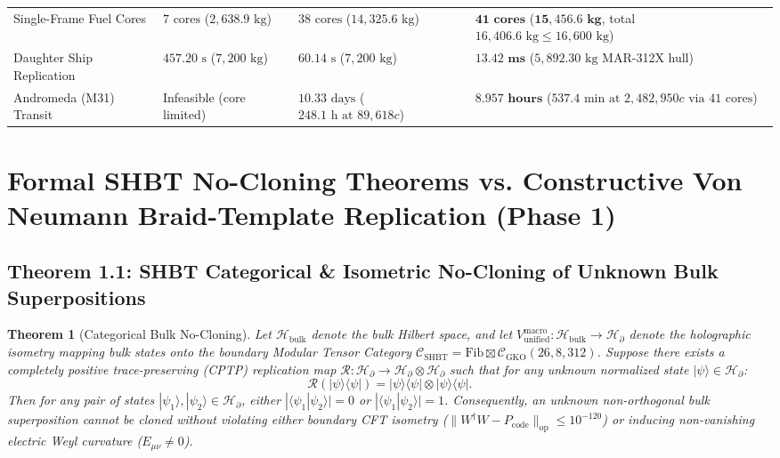 \documentclass[11pt,onecolumn]{article}
\newtheorem{theorem}{Theorem}
\begin{document}
\begin{table}[!htbp]
{\begin{tabular}{@{}llll@{}}
Single-Frame Fuel Cores & $7\text{ cores}$ ($2{,}638.9\text{ kg}$) & $38\text{ cores}$ ($14{,}325.6\text{ kg}$) & $\mathbf{41\text{ cores}}$ ($\mathbf{15{,}456.6\text{ kg}}$, total $16{,}406.6\text{ kg} \le 16{,}600\text{ kg}$) \\
Daughter Ship Replication & $457.20\text{ s}$ ($7{,}200\text{ kg}$) & $60.14\text{ s}$ ($7{,}200\text{ kg}$) & $\mathbf{13.42\text{ ms}}$ ($5{,}892.30\text{ kg}$ MAR-312X hull) \\
Andromeda (M31) Transit & Infeasible (core limited) & $10.33\text{ days}$ ($248.1\text{ h at } 89{,}618c$) & $\mathbf{8.957\text{ hours}}$ ($537.4\text{ min at } 2{,}482{,}950c\text{ via } 41\text{ cores}$) \\
\bottomrule
\end{tabular}%
}
\end{table}
\FloatBarrier
\section{Formal SHBT No-Cloning Theorems vs. Constructive Von Neumann Braid-Template Replication (Phase 1)}

\subsection{Theorem 1.1: SHBT Categorical \& Isometric No-Cloning of Unknown Bulk Superpositions}
\begin{theorem}[Categorical Bulk No-Cloning]
\label{thm:cat_no_clone}
Let $\mathcal{H}_{\text{bulk}}$ denote the bulk Hilbert space, and let $V_{\text{unified}}^{\text{macro}} : \mathcal{H}_{\text{bulk}} \to \mathcal{H}_{\partial}$ denote the holographic isometry mapping bulk states onto the boundary Modular Tensor Category $\mathcal{C}_{\text{SHBT}} = \text{Fib} \boxtimes \mathcal{C}_{\text{GKO}}(26, 8, 312)$. Suppose there exists a completely positive trace-preserving (CPTP) replication map $\mathcal{R} : \mathcal{H}_\partial \to \mathcal{H}_\partial \otimes \mathcal{H}_\partial$ such that for any unknown normalized state $|\psi\rangle \in \mathcal{H}_\partial$:
\begin{equation}
\mathcal{R}(|\psi\rangle\langle\psi|) = |\psi\rangle\langle\psi| \otimes |\psi\rangle\langle\psi|.
\label{eq:cloning_map_hypothesis}
\end{equation}
Then for any pair of states $|\psi_1\rangle, |\psi_2\rangle \in \mathcal{H}_\partial$, either $|\langle\psi_1|\psi_2\rangle| = 0$ or $|\langle\psi_1|\psi_2\rangle| = 1$. Consequently, an unknown non-orthogonal bulk superposition cannot be cloned without violating either boundary CFT isometry ($\|W^\dagger W - P_{\text{code}}\|_{\text{op}} \le 10^{-120}$) or inducing non-vanishing electric Weyl curvature ($E_{\mu\nu} \neq 0$).
\end{theorem}
\end{document}
